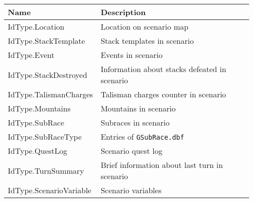 \begin{tabularx}{\linewidth}{| l | X |}
\hline
\textbf{Name} & \textbf{Description} \\
\hline
IdType.Location & Location on scenario map\\
\hline
IdType.StackTemplate & Stack templates in scenario\\
\hline
IdType.Event & Events in scenario\\
\hline
IdType.StackDestroyed & Information about stacks defeated in scenario\\
\hline
IdType.TalismanCharges & Talisman charges counter in scenario\\
\hline
IdType.Mountains & Mountains in scenario\\
\hline
IdType.SubRace & Subraces in scenario\\
\hline
IdType.SubRaceType & Entries of \texttt{GSubRace.dbf}\\
\hline
IdType.QuestLog & Scenario quest log\\
\hline
IdType.TurnSummary & Brief information about last turn in scenario\\
\hline
IdType.ScenarioVariable & Scenario variables\\
\hline
\end{tabularx}
